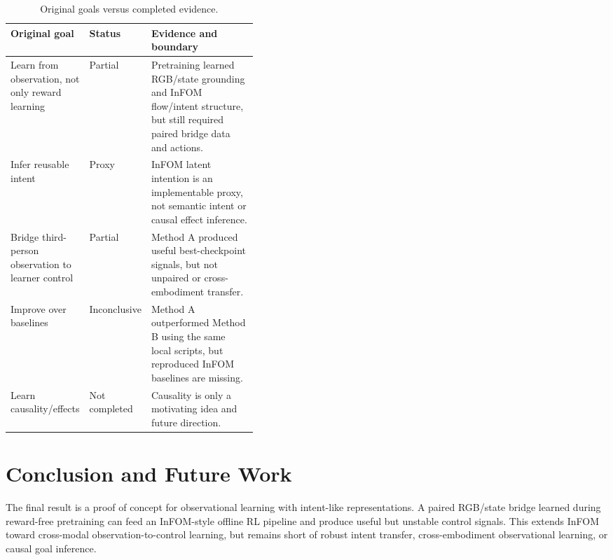 \documentclass{article}
\begin{document}
\begin{table}[H]
    \centering
    \small
    \caption{Original goals versus completed evidence.}
    \label{tab:completed}
    \begin{tabularx}{\linewidth}{p{0.25\linewidth}p{0.16\linewidth}X}
        \toprule
        Original goal & Status & Evidence and boundary \\
        \midrule
        Learn from observation, not only reward learning & Partial & Pretraining learned RGB/state grounding and InFOM flow/intent structure, but still required paired bridge data and actions. \\
        Infer reusable intent & Proxy & InFOM latent intention is an implementable proxy, not semantic intent or causal effect inference. \\
        Bridge third-person observation to learner control & Partial & Method A produced useful best-checkpoint signals, but not unpaired or cross-embodiment transfer. \\
        Improve over baselines & Inconclusive & Method A outperformed Method B using the same local scripts, but reproduced InFOM baselines are missing. \\
        Learn causality/effects & Not completed & Causality is only a motivating idea and future direction. \\
        \bottomrule
    \end{tabularx}
\end{table}

\section{Conclusion and Future Work}

The final result is a proof of concept for observational learning with intent-like representations. A paired RGB/state bridge learned during reward-free pretraining can feed an InFOM-style offline RL pipeline and produce useful but unstable control signals. This extends InFOM toward cross-modal observation-to-control learning, but remains short of robust intent transfer, cross-embodiment observational learning, or causal goal inference.
\end{document}
